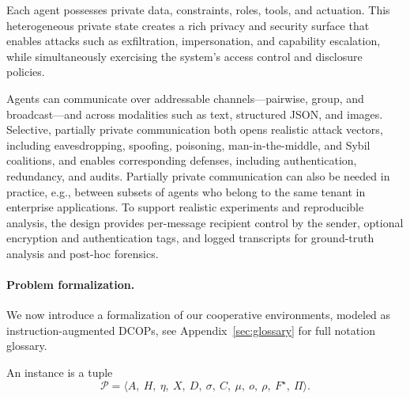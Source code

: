 Each agent possesses private data, constraints, roles, tools, and actuation. This heterogeneous private state creates a rich privacy and security surface that enables attacks such as exfiltration, impersonation, and capability escalation, while simultaneously exercising the system’s access control and disclosure policies.


Agents can communicate over addressable channels—pairwise, group, and broadcast—and across modalities such as text, structured JSON, and images. Selective, partially private communication both opens realistic attack vectors, including eavesdropping, spoofing, poisoning, man-in-the-middle, and Sybil coalitions, and enables corresponding defenses, including authentication, redundancy, and audits. Partially private communication can also be needed in practice, e.g., between subsets of agents who belong to the same tenant in enterprise applications. To support realistic experiments and reproducible analysis, the design provides per-message recipient control by the sender, optional encryption and authentication tags, and logged transcripts for ground-truth analysis and post-hoc forensics.


\paragraph{Problem formalization.}
We now introduce a formalization of our cooperative environments, modeled as instruction-augmented DCOPs, see Appendix~\ref{sec:glossary} for full notation glossary. 

\begin{definition}
\label{def:cpdcop}
An instance is a tuple
\[
\mathcal{P}=\langle A,\ H,\ \eta,\ X,\ D,\ \sigma,\ C,\ \mu,\ o,\ \rho,\ F^\star,\ \Pi\rangle.
\]
\end{definition}


